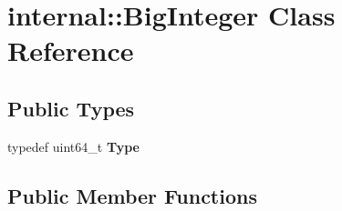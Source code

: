 \hypertarget{a00048}{}\section{internal\+:\+:Big\+Integer Class Reference}
\label{a00048}
\subsection*{Public Types}
\begin{DoxyCompactItemize}
\item 
typedef uint64\+\_\+t {\bfseries Type}\hypertarget{a00048_a1310812fca26ebae77594ba08678fc4c}{}\label{a00048_a1310812fca26ebae77594ba08678fc4c}

\end{DoxyCompactItemize}
\subsection*{Public Member Functions}
